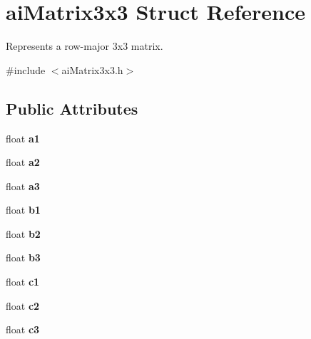 \hypertarget{structai_matrix3x3}{\section{ai\-Matrix3x3 Struct Reference}
\label{structai_matrix3x3}
}


Represents a row-\/major 3x3 matrix.  




{\ttfamily \#include $<$ai\-Matrix3x3.\-h$>$}

\subsection*{Public Attributes}
\begin{DoxyCompactItemize}
\item 
\hypertarget{structai_matrix3x3_a6884258a2f50758ed8b554b531186917}{float {\bfseries a1}}\label{structai_matrix3x3_a6884258a2f50758ed8b554b531186917}

\item 
\hypertarget{structai_matrix3x3_a4c74733870193040ba4953fb673e77df}{float {\bfseries a2}}\label{structai_matrix3x3_a4c74733870193040ba4953fb673e77df}

\item 
\hypertarget{structai_matrix3x3_a851d391df32a39e1ced1a9a286b38cf4}{float {\bfseries a3}}\label{structai_matrix3x3_a851d391df32a39e1ced1a9a286b38cf4}

\item 
\hypertarget{structai_matrix3x3_a9eeba340d3502017caad70416f03863a}{float {\bfseries b1}}\label{structai_matrix3x3_a9eeba340d3502017caad70416f03863a}

\item 
\hypertarget{structai_matrix3x3_a9f5e25b60bbd7bdf8f0a19cd82cc6b15}{float {\bfseries b2}}\label{structai_matrix3x3_a9f5e25b60bbd7bdf8f0a19cd82cc6b15}

\item 
\hypertarget{structai_matrix3x3_a21aa4345fe6ce2774db94d118c536d02}{float {\bfseries b3}}\label{structai_matrix3x3_a21aa4345fe6ce2774db94d118c536d02}

\item 
\hypertarget{structai_matrix3x3_ae62a2877076cbee151e89cb34567e3ca}{float {\bfseries c1}}\label{structai_matrix3x3_ae62a2877076cbee151e89cb34567e3ca}

\item 
\hypertarget{structai_matrix3x3_a8e0d85d5c46eb4f4478f1fe159be4320}{float {\bfseries c2}}\label{structai_matrix3x3_a8e0d85d5c46eb4f4478f1fe159be4320}

\item 
\hypertarget{structai_matrix3x3_aa7eef894dec22db1011092410b24f19b}{float {\bfseries c3}}\label{structai_matrix3x3_aa7eef894dec22db1011092410b24f19b}

\end{DoxyCompactItemize}


